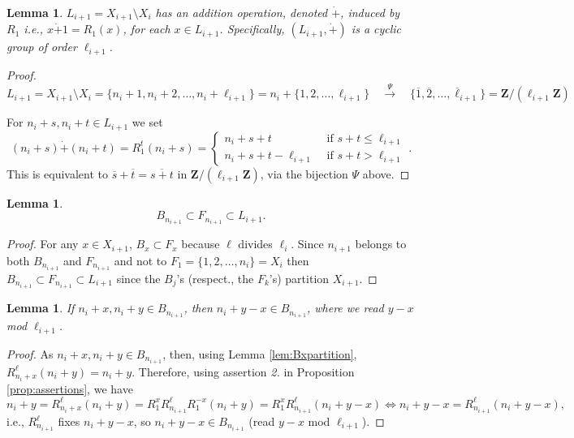 \documentclass{article}
\newtheorem{lemma}[theorem]{Lemma}
\begin{document}
\begin{lemma}
$L_{i+1}= X_{i+1}\setminus X_i$ has an addition operation, denoted $\dot{+}$, induced by $R_1$ i.e., $x\dot{+}1=R_1(x)$, for each $x\in L_{i+1}$. Specifically, $(L_{i+1}, \dot{+})$ is a cyclic group of order $\ell_{i+1}$.
\end{lemma}
\begin{proof}
$$L_{i+1}= X_{i+1}\setminus X_i = \{n_i+1, n_i+2, \dots , n_i+\ell_{i+1}\}=n_i+\{1, 2, \dots , \ell_{i+1}\}  \overset{\Psi}{\quad
\longrightarrow \quad} \{ \overline{1}, \overline{2}, \dots , \overline{\ell}_{i+1}\}=\mathbf{Z}/(\ell_{i+1}\mathbf{Z})$$

For $n_i+s,n_i+t\in L_{i+1}$ we set $$(n_i+s)\dot{+}(n_i+t)=R_1^t(n_i+s)=\begin{cases}
n_i+s+t&\text{ if } s+t\leq \ell_{i+1}\\
n_i+s+t-\ell_{i+1}&\text{ if }s+t>\ell_{i+1}
\end{cases} .$$This is equivalent to $\overline{s}+\overline{t}=\overline{s+t}$ in $\mathbf{Z}/(\ell_{i+1}\mathbf{Z})$, via the bijection $\Psi$ above.
\end{proof}


\begin{lemma}\label{lem:BFL}
$$B_{n_{i+1}} \subset F_{n_{i+1}}\subset L_{i+1} .$$
\end{lemma}
\begin{proof}
For any $x\in X_{i+1}$,  $B_x\subset F_x$ because $\ell$ divides $\ell_i$.  Since $n_{i+1}$ belongs to both $B_{n_{i+1}}$ and $F_{n_{i+1}}$ and not to $F_1=\{1, 2, \dots , n_i\}=X_i$ then $B_{n_{i+1}}\subset F_{n_{i+1}} \subset L_{i+1}$ since the $B_j$'s (respect., the $F_k$'s) partition $X_{i+1}$.
\end{proof}

\begin{lemma}\label{lem:additivityB}
If $n_i+x, n_i+y\in B_{n_{i+1}}$, then $n_i+y-x\in B_{n_{i+1}}$, where we read $y-x$ mod $\ell_{i+1}$.
\end{lemma}
\begin{proof}
As $n_i+x,n_i+y\in B_{n_{i+1}}$, then, using Lemma \ref{lem:Bxpartition}, $R_{n_i+x}^\ell(n_i+y)=n_i+y$. Therefore, using assertion \textit{2.} in Proposition \ref{prop:assertions}, we have
\[n_i+y=R_{n_i+x}^\ell(n_i+y)=R_1^x R_{n_{i+1}}^\ell R_1^{-x}(n_i+y)=R_1^x R_{n_{i+1}}^\ell(n_i+y-x)\Leftrightarrow n_i+y-x=R_{n_{i+1}}^\ell(n_i+y-x),\]
i.e., $R_{n_{i+1}}^\ell$ fixes $n_i+y-x$, so $n_i+y-x\in B_{n_{i+1}}$ (read $y-x$ mod $\ell_{i+1}$).
\end{proof}
\end{document}
